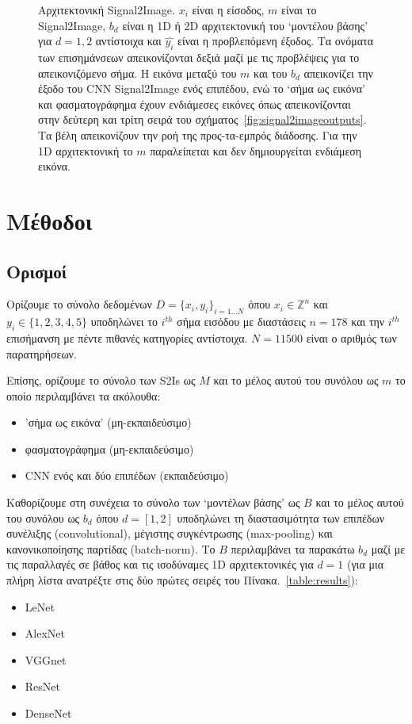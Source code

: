 \begin{figure}
	\caption[Αρχιτεκτονική Signal2Image]{Αρχιτεκτονική Signal2Image.
	$x_i$ είναι η είσοδος, $m$ είναι το Signal2Image, $b_d$ είναι η 1D ή 2D αρχιτεκτονική του `μοντέλου βάσης' για $d=1,2$ αντίστοιχα και $\hat{y_i}$ είναι η προβλεπόμενη έξοδος.
	Τα ονόματα των επισημάνσεων απεικονίζονται δεξιά μαζί με τις προβλέψεις για το απεικονιζόμενο σήμα.
	Η εικόνα μεταξύ του $m$ και του $b_d$ απεικονίζει την έξοδο του CNN Signal2Image ενός επιπέδου, ενώ το `σήμα ως εικόνα' και φασματογράφημα έχουν ενδιάμεσες εικόνες όπως απεικονίζονται στην δεύτερη και τρίτη σειρά του σχήματος~\ref{fig:signal2imageoutputs}.
	Τα βέλη απεικονίζουν την ροή της προς-τα-εμπρός διάδοσης.
	Για την 1D αρχιτεκτονική το $m$ παραλείπεται και δεν δημιουργείται ενδιάμεση εικόνα.}
	\label{fig:highleveloverview}
\end{figure}

\section{Μέθοδοι}
\subsection{Ορισμοί}
Ορίζουμε το σύνολο δεδομένων $D=\{x_i, y_i\}_{i=1\ldots N}$ όπου $x_i \in \mathbb{Z}^n$ και $y_i \in \{1, 2, 3, 4, 5\}$ υποδηλώνει το $i^{th}$ σήμα εισόδου με διαστάσεις $n=178$ και την $i^{th}$ επισήμανση με πέντε πιθανές κατηγορίες αντίστοιχα.
$N=11500$ είναι ο αριθμός των παρατηρήσεων.

Επίσης, ορίζουμε το σύνολο των S2Is ως $M$ και το μέλος αυτού του συνόλου ως $m$ το οποίο περιλαμβάνει τα ακόλουθα:
\begin{itemize}
	\item 'σήμα ως εικόνα' (μη-εκπαιδεύσιμο)
	\item φασματογράφημα (μη-εκπαιδεύσιμο)
	\item CNN ενός και δύο επιπέδων (εκπαιδεύσιμο)
\end{itemize}

Καθορίζουμε στη συνέχεια το σύνολο των `μοντέλων βάσης' ως $B$ και το μέλος αυτού του συνόλου ως $b_d$ όπου $d=[1,2]$ υποδηλώνει τη διαστασιμότητα των επιπέδων συνέλιξης (convolutional), μέγιστης συγκέντρωσης (max-pooling) και κανονικοποίησης παρτίδας (batch-norm).
Το $B$ περιλαμβάνει τα παρακάτω $b_d$ μαζί με τις παραλλαγές σε βάθος και τις ισοδύναμες 1D αρχιτεκτονικές για $d=1$ (για μια πλήρη λίστα ανατρέξτε στις δύο πρώτες σειρές του Πίνακα.~\ref{table:results}):
\begin{itemize}
	\item LeNet~\cite{lecun1998gradient}
	\item AlexNet~\cite{krizhevsky2012imagenet}
	\item VGGnet~\cite{simonyan2014very}
	\item ResNet~\cite{he2016deep}
	\item DenseNet~\cite{huang2017densely}
\end{itemize}

